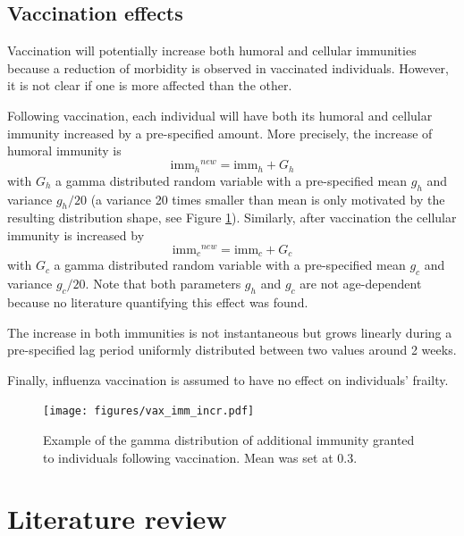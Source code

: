\documentclass[11pt, onecolumn]{article}
\newcommand{\immh}{\ensuremath{\text{imm}_h}}
\newcommand{\immc}{\ensuremath{\text{imm}_c}}
\begin{document}
\subsection{Vaccination effects}

Vaccination will potentially increase both humoral and cellular immunities because a reduction of morbidity is observed in vaccinated individuals. However, it is not clear if one is more affected than the other. 

Following vaccination, each individual will have both its humoral and cellular immunity increased by a pre-specified amount. More precisely, the increase of humoral immunity is
\begin{equation}
\immh^{new} = \immh + G_h
\end{equation}
with $G_h$ a gamma distributed random variable with a pre-specified mean $g_h$ and variance $g_h/20$ (a variance 20 times smaller than mean is  only motivated by the resulting distribution shape, see Figure \ref{fig:vax_imm_incr}). 
Similarly, after vaccination the cellular immunity is increased by
\begin{equation}
\immc^{new} = \immc + G_c
\end{equation}
with $G_c$ a gamma distributed random variable with a pre-specified mean $g_c$ and variance $g_c/20$. 
Note that both parameters $g_h$ and $g_c$ are not age-dependent because no literature quantifying this effect was found.

The increase in both immunities is not instantaneous but grows linearly during a pre-specified lag period uniformly distributed between two values around 2 weeks.

Finally, influenza vaccination is assumed to have no effect on individuals' frailty. 

\begin{figure}[!ht]
\centering
    \texttt{[image: figures/vax\_imm\_incr.pdf]}
\caption{Example of the gamma distribution of additional immunity granted to individuals following vaccination. Mean was set at 0.3.}
\label{fig:vax_imm_incr}
\end{figure}








\newpage
\appendix

\section{Literature review}
\end{document}
